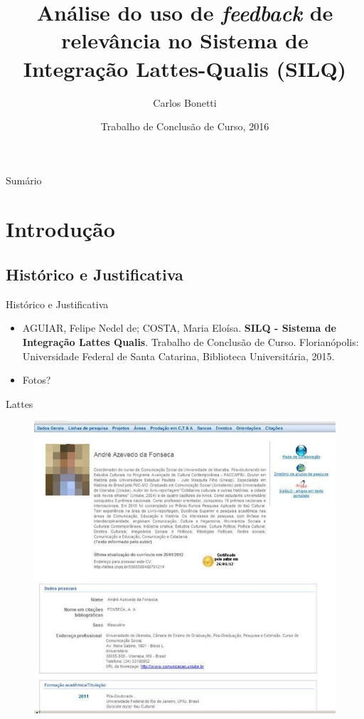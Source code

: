 \documentclass{beamer}
\title{Análise do uso de \textit{feedback} de relevância no Sistema de Integração Lattes-Qualis (SILQ)}
\author{Carlos Bonetti\inst{1}}
\institute[Universidade Federal de Santa Catarina] %
{
  \inst{1}%
  Bacharelando de Ciência da Computação\\
  Departamento de Informática e Estatística\\
  Centro Tecnológico\\
  Universidade Federal de Santa Catarina
}
\date{Trabalho de Conclusão de Curso, 2016}
\begin{document}
\begin{frame}
  \titlepage
\end{frame}

\begin{frame}{Sumário}
  \tableofcontents
\end{frame}

\section{Introdução}

\subsection{Histórico e Justificativa}

\begin{frame}{Histórico e Justificativa}
  \begin{itemize}
    \item AGUIAR, Felipe Nedel de; COSTA, Maria Eloísa. \textbf{SILQ - Sistema de Integração Lattes Qualis}. Trabalho de Conclusão de Curso. Florianópolis: Universidade Federal de Santa Catarina, Biblioteca Universitária, 2015.
    \pause
    \item Fotos?
  \end{itemize}
\end{frame}

\begin{frame}{Lattes}
  \begin{figure}
    \includegraphics[scale=0.3]{figuras/lattes.jpg}
  \end{figure}
\end{frame}
\end{document}
